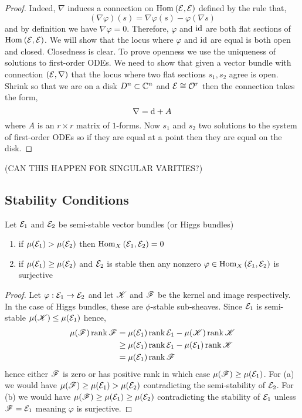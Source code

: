 \documentclass[12pt]{article}
\begin{document}
\begin{proof}
Indeed, $\nabla$ induces a connection on $\mathrm{Hom}_{} \left( \mathcal{E}, \mathcal{E} \right)$ defined by the rule that,
\[ (\nabla \varphi)(s) = \nabla \varphi(s) - \varphi(\nabla s) \]
and by definition we have $\nabla \varphi = 0$. Therefore, $\varphi$ and $\mathrm{id}$ are both flat sections of $\mathrm{Hom}_{} \left( \mathcal{E}, \mathcal{E} \right)$. We will show that the locus where $\varphi$ and $\mathrm{id}$ are equal is both open and closed. Closedness is clear. To prove openness we use the uniqueness of solutions to first-order ODEs. We need to show that given a vector bundle with connection $(\mathcal{E}, \nabla)$ that the locus where two flat sections $s_1, s_2$ agree is open. Shrink so that we are on a disk $D^n \subset \mathbb{C}^n$ and $\mathcal{E} \cong \mathcal{O}_{}^r$ then the connection takes the form,
\[ \nabla = \mathrm{d} + A \]
where $A$ is an $r \times r$ matrix of $1$-forms. Now $s_1$ and $s_2$ two solutions to the system of first-order ODEs so if they are equal at a point then they are equal on the disk.  
\end{proof}

(CAN THIS HAPPEN FOR SINGULAR VARITIES?)

\subsection{Stability Conditions}

\begin{lemma}
Let $\mathcal{E}_1$ and $\mathcal{E}_2$ be semi-stable vector bundles (or Higgs bundles)
\begin{enumerate}
\item if $\mu(\mathcal{E}_1) > \mu(\mathcal{E}_2)$ then $\mathrm{Hom}_{X} \left( \mathcal{E}_1, \mathcal{E}_2 \right) = 0$
\item if $\mu(\mathcal{E}_1) \ge \mu(\mathcal{E}_2)$ and $\mathcal{E}_2$ is stable then any nonzero $\varphi \in \mathrm{Hom}_{X} \left( \mathcal{E}_1, \mathcal{E}_2 \right)$ is surjective
\end{enumerate}
\end{lemma}

\begin{proof}
Let $\varphi : \mathcal{E}_1 \to \mathcal{E}_2$ and let $\mathscr{K}$ and $\mathscr{F}$ be the kernel and image respectively. In the case of Higgs bundles, these are $\phi$-stable sub-sheaves. Since $\mathcal{E}_1$ is semi-stable $\mu(\mathscr{K}) \le \mu(\mathcal{E}_1)$ hence,
\begin{align*}
\mu(\mathscr{F}) \operatorname{\mathrm{rank}}{\mathscr{F}} &= \mu(\mathcal{E}_1) \operatorname{\mathrm{rank}}{\mathcal{E}_1} - \mu(\mathscr{K}) \operatorname{\mathrm{rank}}{\mathscr{K}} 
\\
& \ge \mu(\mathcal{E}_1) \operatorname{\mathrm{rank}}{\mathcal{E}_1} - \mu(\mathcal{E}_1) \operatorname{\mathrm{rank}}{\mathscr{K}}
\\
& = \mu(\mathcal{E}_1) \operatorname{\mathrm{rank}}{\mathscr{F}}
\end{align*}
hence either $\mathscr{F}$ is zero or has positive rank in which case $\mu(\mathscr{F}) \ge \mu(\mathcal{E}_1)$. For (a) we would have $\mu(\mathscr{F}) \ge \mu(\mathcal{E}_1) > \mu(\mathcal{E}_2)$ contradicting the semi-stability of $\mathcal{E}_2$. For (b) we would have $\mu(\mathscr{F}) \ge \mu(\mathcal{E}_1) \ge \mu(\mathcal{E}_2)$ contradicting the stability of $\mathcal{E}_1$ unless $\mathscr{F} = \mathcal{E}_1$ meaning $\varphi$ is surjective.
\end{proof}
\end{document}
